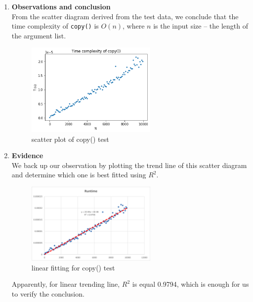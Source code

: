 \documentclass[12pt]{article}
\begin{document}
\begin{enumerate}[(1)]
\item \textbf{Observations and conclusion}\\
From the scatter diagram derived from the test data, we conclude that the time complexity of \verb|copy()| is \(O(n)\), where \(n\) is the input size \--- the length of the argument list.

\begin{figure}[h!]
\centering
\includegraphics[width=0.6\textwidth,height=\textheight,keepaspectratio]{figure_1.png}
\caption{scatter plot of copy() test}
\label{Figure: 1}
\end{figure}

\newpage \item \textbf{Evidence}\\
We back up our observation by plotting the trend line of this scatter diagram and determine which one is best fitted using \(R^2\).

\begin{figure}[h!]
\centering
\includegraphics[width=0.6\textwidth,height=\textheight,keepaspectratio]{picture/copy.png}
\caption{linear fitting for copy() test}
\label{copy}
\end{figure}

Apparently, for linear trending line, \(R^2\) is equal 0.9794, which is enough for us to verify the conclusion.


\end{enumerate}
\end{document}

